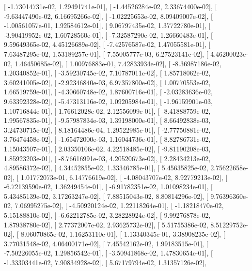 \documentclass{article}
\begin{document}
       [ -1.73014731e-02,   1.29491741e-01],
       [ -1.44526284e-02,   2.33674400e-02],
       [ -9.63447490e-02,   6.16695266e-02],
       [ -1.02225653e-02,   8.09409007e-02],
       [ -1.00561057e-01,   1.92584612e-01],
       [  9.06797435e-02,   1.37722780e-01],
       [ -3.90419952e-02,   1.60728560e-01],
       [ -7.32587290e-02,   1.26660483e-01],
       [  9.59649365e-02,   4.45126689e-02],
       [ -7.42576587e-02,   1.47055581e-01],
       [  7.63487295e-02,   1.53189257e-01],
       [  7.55005777e-03,   6.27523141e-02],
       [  4.46200023e-02,   1.46450685e-02],
       [  1.00976883e-01,   7.42833934e-02],
       [ -8.36987186e-02,   1.20340852e-01],
       [ -3.59230745e-02,   7.10787011e-02],
       [  1.85718062e-02,   3.60241005e-02],
       [ -2.92346840e-03,   6.97357800e-02],
       [  1.00770553e-02,   1.66519759e-01],
       [ -4.30660748e-02,   1.87600716e-01],
       [ -2.03283636e-02,   9.63392328e-02],
       [ -5.47313116e-02,   1.09205984e-01],
       [ -1.96159901e-03,   1.10716844e-01],
       [  1.76612028e-02,   2.12556099e-01],
       [ -8.41888759e-02,   1.99567835e-01],
       [ -9.57987834e-03,   1.39198000e-01],
       [  8.66492838e-03,   3.24730715e-02],
       [  8.18164486e-04,   1.29522985e-01],
       [ -2.77750881e-02,   3.76474458e-02],
       [ -1.65472000e-03,   1.16044736e-01],
       [  8.82786731e-02,   1.15043507e-01],
       [  2.03350106e-02,   4.22518485e-02],
       [ -9.81190208e-03,   1.85923203e-01],
       [ -8.76616991e-03,   4.20520673e-02],
       [  2.28434213e-02,   4.89586372e-02],
       [  4.34452855e-02,   1.33346785e-01],
       [  5.45635825e-02,   2.75622658e-02],
       [  1.01772073e-01,   6.14776619e-02],
       [ -4.08043707e-02,   8.92779213e-02],
       [ -6.72139590e-02,   1.36249454e-01],
       [ -6.91782351e-02,   1.01098234e-01],
       [  5.43485139e-02,   3.17263247e-02],
       [  7.88515043e-02,   8.80814296e-02],
       [  9.76396360e-02,   7.06995275e-02],
       [ -4.50920124e-02,   1.22118264e-01],
       [ -1.18218470e-02,   5.15188810e-02],
       [ -6.62212785e-02,   3.28228924e-02],
       [  9.99276878e-02,   1.87938780e-02],
       [  2.77372007e-02,   2.93625732e-02],
       [  5.51755386e-02,   8.51229752e-02],
       [  8.06070865e-02,   1.16253110e-01],
       [  1.13340345e-01,   3.38908235e-02],
       [  3.77031548e-02,   4.06400171e-02],
       [  7.45542162e-02,   1.99183515e-01],
       [ -7.50226055e-02,   1.29856542e-01],
       [ -3.50941868e-02,   1.47830654e-01],
       [ -1.33303441e-02,   7.90834928e-02],
       [  5.67179794e-02,   1.31357126e-02],
\end{document}
